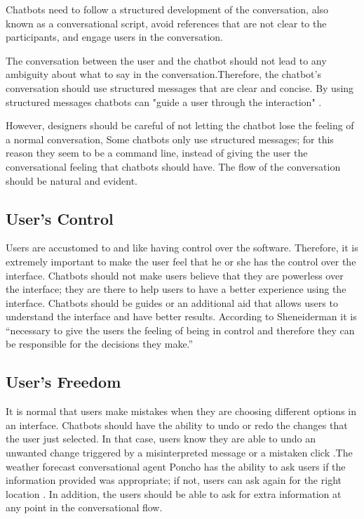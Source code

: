\documentclass[a4paper,10pt]{article}
\begin{document}
Chatbots need to follow a structured development of the conversation, also known as a conversational script, avoid references that are not clear to the participants, and engage users in the conversation.

The conversation between the user and the chatbot should not lead to any ambiguity about what to say in the conversation.Therefore, the chatbot's conversation should use structured messages that are clear and concise. By using structured messages chatbots can "guide a user through the interaction" \cite{HeuristicsWebPage}.

However, designers should be careful of not letting the chatbot lose the feeling of a normal conversation, Some chatbots only use structured messages; for this reason they seem to be a command line, instead of giving the user the conversational feeling that chatbots should have. The flow of the conversation should be natural and evident. 


\subsection*{User's Control}

Users are accustomed to and like having control over the software. Therefore, it is extremely important to make the user feel that he or she has the control over the interface. Chatbots should not make users believe that they are powerless over the interface; they are there to help users to have a better experience using the interface. Chatbots should be guides or an additional aid that allows users to understand the interface and have better results. According to Sheneiderman \cite{shneiderman1997direct} it is ``necessary to give the users the feeling of being in control and therefore they can be responsible for the decisions they make.” 

\subsection*{User's Freedom}

It is normal that users make mistakes when they are choosing different options in an interface. Chatbots should have the ability to undo or redo the changes that the user just selected. In that case, users know they are able to undo an unwanted change triggered by a misinterpreted message or a mistaken click \cite{HeuristicsWebPage}.The weather forecast conversational agent Poncho has the ability to ask users if the information provided was appropriate; if not, users can ask again for the right location \cite{poncho2017}. In addition, the users should be able to ask for extra information at any point in the conversational flow.
\end{document}
